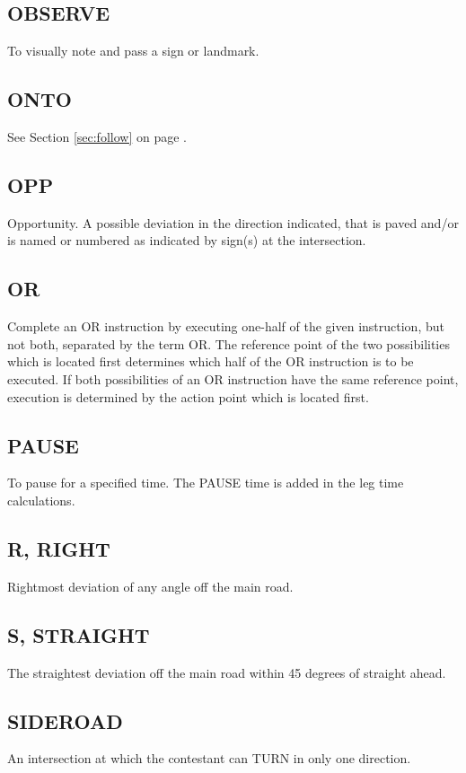 \subsection{OBSERVE}
To visually note and pass a sign or landmark.

\subsection{ONTO}
See Section \ref{sec:follow} on page \pageref{sec:follow}.

\subsection{OPP}
Opportunity.  A possible deviation in the direction indicated, that is paved and/or is named or numbered as indicated by sign(s) at the intersection.

\subsection{OR}
Complete an OR instruction by executing one-half of the given instruction, but not both, separated by the term OR.  The reference point of the two possibilities which is located first determines which half of the OR instruction is to be executed.  If both possibilities of an OR instruction have the same reference point, execution is determined by the action point which is located first.

\subsection{PAUSE}
To pause for a specified time.  The PAUSE time is added in the leg time calculations.

\subsection{R, RIGHT}
Rightmost deviation of any angle off the main road.

\subsection{S, STRAIGHT}
The straightest deviation off the main road within 45 degrees of straight ahead.

\subsection{SIDEROAD}
An intersection at which the contestant can TURN in only one direction.

